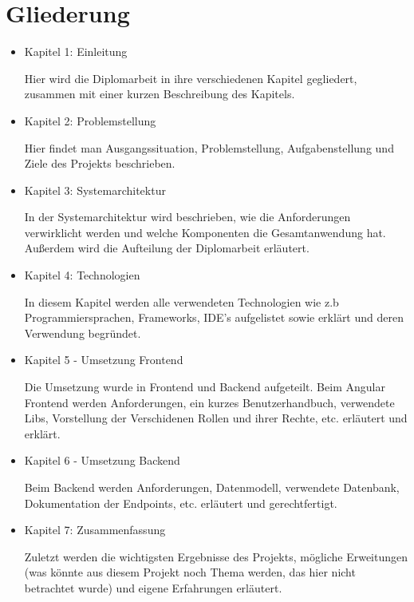 \section{Gliederung}

\begin{itemize}
    \item  Kapitel 1: Einleitung
    
    Hier wird die Diplomarbeit in ihre verschiedenen Kapitel gegliedert, zusammen mit einer kurzen Beschreibung des Kapitels.
    
    \item  Kapitel 2: Problemstellung
    
    Hier findet man Ausgangssituation, Problemstellung, Aufgabenstellung und Ziele des Projekts beschrieben.
    
    \item  Kapitel 3: Systemarchitektur
    
    In der Systemarchitektur wird beschrieben, wie die Anforderungen verwirklicht werden und welche Komponenten die Gesamtanwendung hat. 
    Außerdem wird die Aufteilung der Diplomarbeit erläutert.

    \item  Kapitel 4: Technologien
    
    In diesem Kapitel werden alle verwendeten Technologien wie z.b Programmiersprachen, Frameworks, IDE's aufgelistet sowie erklärt und deren Verwendung begründet.

    \item  Kapitel 5 - Umsetzung Frontend
    
    Die Umsetzung wurde in Frontend und Backend aufgeteilt. Beim Angular Frontend werden Anforderungen, ein kurzes Benutzerhandbuch, verwendete Libs, Vorstellung der Verschidenen Rollen und ihrer Rechte, etc. erläutert und erklärt.
    
    \item  Kapitel 6 - Umsetzung Backend
    
    Beim Backend werden Anforderungen, Datenmodell, verwendete Datenbank, Dokumentation der Endpoints, etc. erläutert und gerechtfertigt.
    
    \item  Kapitel 7: Zusammenfassung
    
    Zuletzt werden die wichtigsten Ergebnisse des Projekts, mögliche Erweitungen (was könnte aus diesem Projekt noch Thema werden, 
    das hier nicht betrachtet wurde) und eigene Erfahrungen erläutert.
\end{itemize}